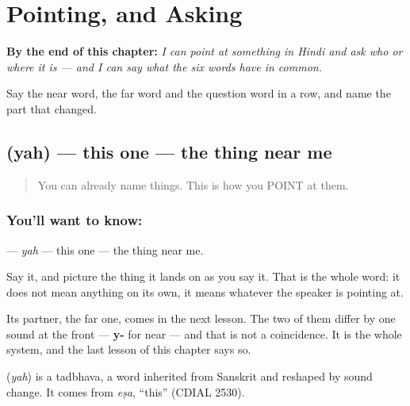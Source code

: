 
\chapter{Pointing, and Asking}
\label{ch:hi-pointing-and-asking}

\begin{chapteropening}
\textbf{By the end of this chapter:} \emph{I can point at something in Hindi and ask who or where it is — and I can say what the six words have in common.}

Say the near word, the far word and the question word in a row, and name the part that changed.
\end{chapteropening}

\section[\texorpdfstring{\hi{यह} (yah)}{यह (yah)}]{ (yah) — this one — the thing near me}

\label{lesson:HI-C40-this}



\begin{quote}
You can already name things. This is how you POINT at them.
\end{quote}

\subsection*{You'll want to know: }
\textbf{} — \emph{yah} — this one — the thing near me.

Say it, and picture the thing it lands on as you say it. That is the whole word: it does not mean anything on its own, it means whatever the speaker is pointing at.

Its partner, the far one, comes in the next lesson. The two of them differ by one sound at the front — \textbf{y-} for near — and that is not a coincidence. It is the whole system, and the last lesson of this chapter says so.

\begin{cousinweb}
\textbf{} (\emph{yah}) is a tadbhava, a word inherited from Sanskrit and reshaped by sound change. It comes from \emph{eṣa}, \textquotedblleft{}this\textquotedblright{} (CDIAL 2530).
\end{cousinweb}

